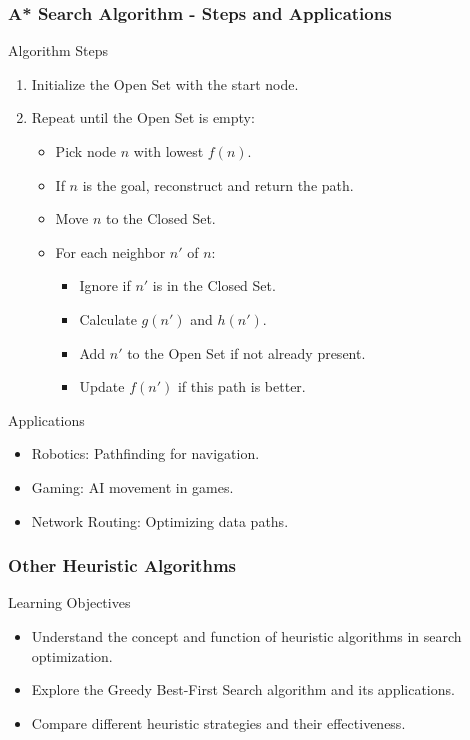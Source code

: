 \documentclass[aspectratio=169]{beamer}
\begin{document}
\begin{frame}[fragile]
    \frametitle{A* Search Algorithm - Steps and Applications}
    \begin{block}{Algorithm Steps}
        \begin{enumerate}
            \item Initialize the Open Set with the start node.
            \item Repeat until the Open Set is empty:
            \begin{itemize}
                \item Pick node $n$ with lowest $f(n)$.
                \item If $n$ is the goal, reconstruct and return the path.
                \item Move $n$ to the Closed Set.
                \item For each neighbor $n'$ of $n$:
                \begin{itemize}
                    \item Ignore if $n'$ is in the Closed Set.
                    \item Calculate $g(n')$ and $h(n')$.
                    \item Add $n'$ to the Open Set if not already present.
                    \item Update $f(n')$ if this path is better.
                \end{itemize}
            \end{itemize}
        \end{enumerate}
    \end{block}

    \begin{block}{Applications}
        \begin{itemize}
            \item Robotics: Pathfinding for navigation.
            \item Gaming: AI movement in games.
            \item Network Routing: Optimizing data paths.
        \end{itemize}
    \end{block}
\end{frame}

\begin{frame}
    \frametitle{Other Heuristic Algorithms}
    \begin{block}{Learning Objectives}
        \begin{itemize}
            \item Understand the concept and function of heuristic algorithms in search optimization.
            \item Explore the Greedy Best-First Search algorithm and its applications.
            \item Compare different heuristic strategies and their effectiveness.
        \end{itemize}
    \end{block}
\end{frame}
\end{document}
